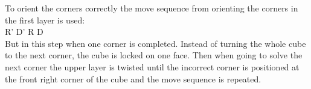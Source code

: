 To orient the corners correctly the move sequence from orienting the corners in the first layer is used: \\

R' D' R D \\

But in this step when one corner is completed. Instead of turning the whole cube to the next corner, the cube is locked on one face. Then when going to solve the next corner the upper layer is twisted until the incorrect corner is positioned at the front right corner of the cube and the move sequence is repeated.
